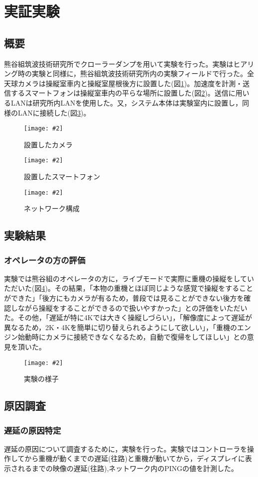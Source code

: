 \documentclass[a4paper,12pt]{jsarticle}
\newcommand{\figuref}[1]{図\ref{#1}}
\newcommand{\fig}[4][width=\textwidth]{
    \begin{figure}[!h]
    \begin{center}
    \texttt{[image: \#2]}
    \caption{#3}
    \label{#4}
    \vspace*{-1cm}
    \end{center}
    \end{figure}
}
\begin{document}
\section{実証実験}
\subsection{概要}
熊谷組筑波技術研究所でクローラーダンプを用いて実験を行った。実験はヒアリング時の実験と同様に，熊谷組筑波技術研究所内の実験フィールドで行った。全天球カメラは操縦室車内と操縦室屋根後方に設置した(\figuref{camera_test})。加速度を計測・送信するスマートフォンは操縦室車内の平らな場所に設置した(\figuref{phone})。送信に用いるLANは研究所内LANを使用した。又，システム本体は実験室内に設置し，同様のLANに接続した(\figuref{lan})。
\fig[width=7cm]{image/camera_test.png}{設置したカメラ}{camera_test}
\fig[width=7cm]{image/phone.jpg}{設置したスマートフォン}{phone}
\clearpage
\fig[width=7cm]{image/lan.png}{ネットワーク構成}{lan}

\subsection{実験結果}
\subsubsection{オペレータの方の評価}
実験では熊谷組のオペレータの方に，ライブモードで実際に重機の操縦をしていただいた(\figuref{test})。その結果，「本物の重機とほぼ同じような感覚で操縦をすることができた」「後方にもカメラが有るため，普段では見ることができない後方を確認しながら操縦をすることができるので扱いやすかった」との評価をいただいた。その他，「遅延が特に4Kでは大きく操縦しづらい」，「解像度によって遅延が異なるため，2K・4Kを簡単に切り替えられるようにして欲しい」，「重機のエンジン始動時にカメラに接続できなくなるため，自動で復帰をしてほしい」との意見を頂いた。
\fig[width=7cm]{image/test.jpg}{実験の様子}{test}
\clearpage

\subsection{原因調査}
\subsubsection{遅延の原因特定}
遅延の原因について調査するために，実験を行った。実験ではコントローラを操作してから重機が動くまでの遅延(往路)と重機が動いてから，ディスプレイに表示されるまでの映像の遅延(往路),ネットワーク内のPINGの値を計測した。
\end{document}
